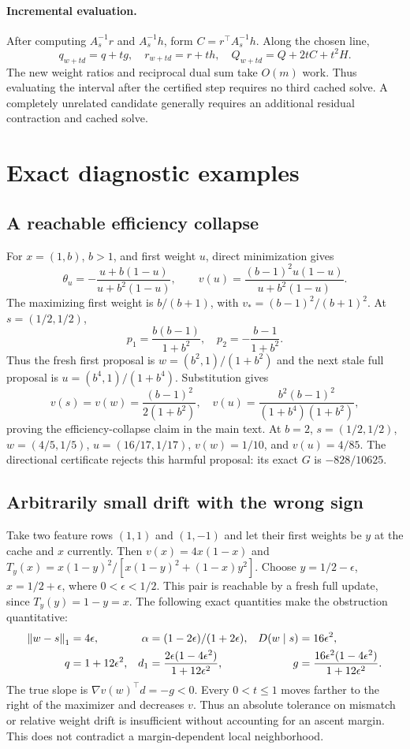 \documentclass[11pt]{article}
\begin{document}
\paragraph{Incremental evaluation.}
After computing $A_s^{-1}r$ and $A_s^{-1}h$, form
$C=r^\top A_s^{-1}h$.
Along the chosen line,
\[
 q_{w+td}=q+tg,\quad r_{w+td}=r+th,\quad
 Q_{w+td}=Q+2tC+t^2H.
\]
The new weight ratios and reciprocal dual sum take $O(m)$ work. Thus evaluating the interval after the certified step requires no third cached solve. A completely unrelated candidate generally requires an additional residual contraction and cached solve.

\section{Exact diagnostic examples}
\subsection{A reachable efficiency collapse}
For $x=(1,b)$, $b>1$, and first weight $u$, direct minimization gives
\[
 \theta_u=-\frac{u+b(1-u)}{u+b^2(1-u)},\qquad
 v(u)=\frac{(b-1)^2u(1-u)}{u+b^2(1-u)}.
\]
The maximizing first weight is $b/(b+1)$, with
$v_*=(b-1)^2/(b+1)^2$.
At $s=(1/2,1/2)$,
\[
 p_1=\frac{b(b-1)}{1+b^2},\quad
 p_2=-\frac{b-1}{1+b^2}.
\]
Thus the fresh first proposal is $w=(b^2,1)/(1+b^2)$ and the next stale full proposal is $u=(b^4,1)/(1+b^4)$.
Substitution gives
\[
 v(s)=v(w)=\frac{(b-1)^2}{2(1+b^2)},\quad
 v(u)=\frac{b^2(b-1)^2}{(1+b^4)(1+b^2)},
\]
proving the efficiency-collapse claim in the main text.
At $b=2$, $s=(1/2,1/2)$, $w=(4/5,1/5)$,
$u=(16/17,1/17)$, $v(w)=1/10$, and $v(u)=4/85$.
The directional certificate rejects this harmful proposal: its exact $G$ is $-828/10625$.

\subsection{Arbitrarily small drift with the wrong sign}
Take two feature rows $(1,1)$ and $(1,-1)$ and let their first weights be $y$ at the cache and $x$ currently. Then
$v(x)=4x(1-x)$ and $T_y(x)=x(1-y)^2/[x(1-y)^2+(1-x)y^2]$.
Choose $y=1/2-\epsilon$, $x=1/2+\epsilon$, where $0<\epsilon<1/2$.
This pair is reachable by a fresh full update, since $T_y(y)=1-y=x$.
The following exact quantities make the obstruction quantitative:
\begin{align*}
 \left\lVert w-s\right\rVert_1&=4\epsilon,&
 \alpha&=(1-2\epsilon)/(1+2\epsilon),&
 D(w\mid s)&=16\epsilon^2,\\
 q&=1+12\epsilon^2,&
 d_1&=\frac{2\epsilon(1-4\epsilon^2)}{1+12\epsilon^2},&
 g&=\frac{16\epsilon^2(1-4\epsilon^2)}{1+12\epsilon^2}.
\end{align*}
The true slope is $\nabla v(w)^\top d=-g<0$.
Every $0<t\le1$ moves farther to the right of the maximizer and decreases $v$.
Thus an absolute tolerance on mismatch or relative weight drift is insufficient without accounting for an ascent margin. This does not contradict a margin-dependent local neighborhood.
\end{document}
